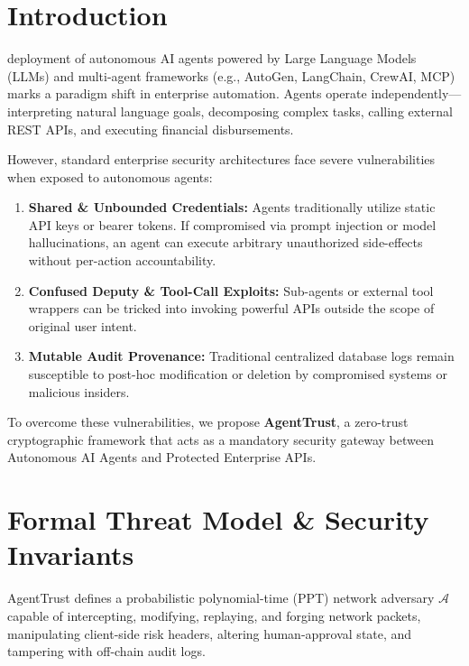 \documentclass[10pt,journal,compsoc]{IEEEtran}
\begin{document}
\maketitle
\IEEEdisplaynontitleabstractindextext
\IEEEpeerreviewmaketitle

\section{Introduction}
 deployment of autonomous AI agents powered by Large Language Models (LLMs) and multi-agent frameworks (e.g., AutoGen, LangChain, CrewAI, MCP) marks a paradigm shift in enterprise automation. Agents operate independently—interpreting natural language goals, decomposing complex tasks, calling external REST APIs, and executing financial disbursements.

However, standard enterprise security architectures face severe vulnerabilities when exposed to autonomous agents:
\begin{enumerate}
    \item \textbf{Shared & Unbounded Credentials:} Agents traditionally utilize static API keys or bearer tokens. If compromised via prompt injection or model hallucinations, an agent can execute arbitrary unauthorized side-effects without per-action accountability.
    \item \textbf{Confused Deputy & Tool-Call Exploits:} Sub-agents or external tool wrappers can be tricked into invoking powerful APIs outside the scope of original user intent.
    \item \textbf{Mutable Audit Provenance:} Traditional centralized database logs remain susceptible to post-hoc modification or deletion by compromised systems or malicious insiders.
\end{enumerate}

To overcome these vulnerabilities, we propose \textbf{AgentTrust}, a zero-trust cryptographic framework that acts as a mandatory security gateway between Autonomous AI Agents and Protected Enterprise APIs.

\section{Formal Threat Model \& Security Invariants}
AgentTrust defines a probabilistic polynomial-time (PPT) network adversary $\mathcal{A}$ capable of intercepting, modifying, replaying, and forging network packets, manipulating client-side risk headers, altering human-approval state, and tampering with off-chain audit logs.
\end{document}

